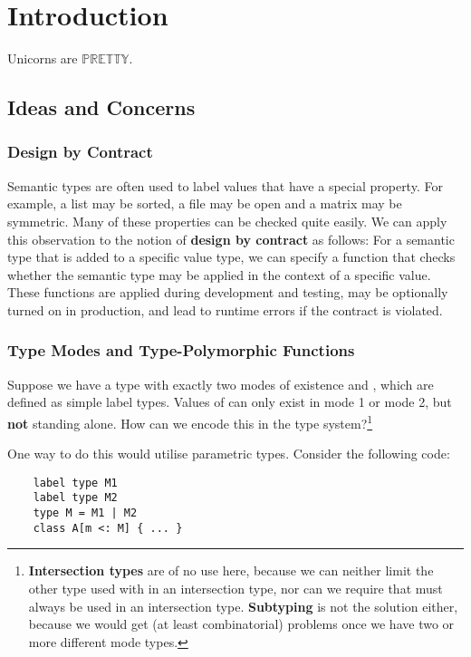 \chapter{Introduction}

Unicorns are $\mathbb{PRETTY}$.


\section{Ideas and Concerns}

\subsection{Design by Contract}
Semantic types are often used to label values that have a special property. For example, a list may be sorted, a file may be open and a matrix may be symmetric. Many of these properties can be checked quite easily. We can apply this observation to the notion of \textbf{design by contract} as follows: For a semantic type that is added to a specific value type, we can specify a function that checks whether the semantic type may be applied in the context of a specific value. These functions are applied during development and testing, may be optionally turned on in production, and lead to runtime errors if the contract is violated.

\subsection{Type Modes and Type-Polymorphic Functions}
Suppose we have a type  with exactly two modes of existence  and , which are defined as simple label types. Values of  can only exist in mode 1 or mode 2, but \textbf{not} standing alone. How can we encode this in the type system?\footnote{\textbf{Intersection types} are of no use here, because we can neither limit the other type used with  in an intersection type, nor can we require that  must always be used in an intersection type. \textbf{Subtyping} is not the solution either, because we would get (at least combinatorial) problems once we have two or more different mode types.}

One way to do this would utilise parametric types. Consider the following code:

\begin{lstlisting}
    label type M1
    label type M2
    type M = M1 | M2
    class A[m <: M] { ... }
\end{lstlisting}

